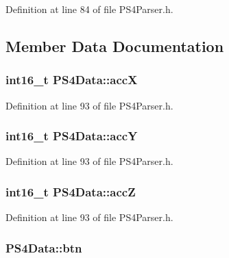 \-Definition at line 84 of file \-P\-S4\-Parser.\-h.



\subsection{\-Member \-Data \-Documentation}
\hypertarget{struct_p_s4_data_a7e4ebbf1e22d59d3d7126bd1d56ee9b4}{
\subsubsection[{acc\-X}]{\setlength{\rightskip}{0pt plus 5cm}int16\-\_\-t {\bf \-P\-S4\-Data\-::acc\-X}}}\label{struct_p_s4_data_a7e4ebbf1e22d59d3d7126bd1d56ee9b4}


\-Definition at line 93 of file \-P\-S4\-Parser.\-h.

\hypertarget{struct_p_s4_data_a8cbe113c7f536bd0c47704d957a97d54}{
\subsubsection[{acc\-Y}]{\setlength{\rightskip}{0pt plus 5cm}int16\-\_\-t {\bf \-P\-S4\-Data\-::acc\-Y}}}\label{struct_p_s4_data_a8cbe113c7f536bd0c47704d957a97d54}


\-Definition at line 93 of file \-P\-S4\-Parser.\-h.

\hypertarget{struct_p_s4_data_a635a4a50b43400707baa74c8e87944ca}{
\subsubsection[{acc\-Z}]{\setlength{\rightskip}{0pt plus 5cm}int16\-\_\-t {\bf \-P\-S4\-Data\-::acc\-Z}}}\label{struct_p_s4_data_a635a4a50b43400707baa74c8e87944ca}


\-Definition at line 93 of file \-P\-S4\-Parser.\-h.

\hypertarget{struct_p_s4_data_a60c0217c1879e1b16ae5d19a8c8695a3}{
\subsubsection[{btn}]{ {\bf \-P\-S4\-Data\-::btn}}}\label{struct_p_s4_data_a60c0217c1879e1b16ae5d19a8c8695a3}


